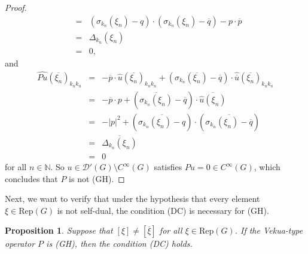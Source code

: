 \documentclass[sn-mathphys-num]{sn-jnl}%
\numberwithin{equation}{section}
\theoremstyle{thmstyleone}
\newtheorem{proposition}[theorem]{Proposition}
\theoremstyle{thmstyletwo}
\theoremstyle{thmstylethree}
\begin{document}
\begin{proof}
\begin{eqnarray*}
	& = & (\sigma_{k_n}(\xi_n)-q)\cdot (\sigma_{k_n}(\xi_n)-\overline{q})- p \cdot \overline{p} \\
	& = & \Delta_{k_n}(\xi_n) \\
	& = & 0, 
\end{eqnarray*} 
and
\begin{eqnarray*}
	\widehat{Pu}(\overline{\xi_n})_{k_n k_n} & = & -\overline{p}\cdot \widehat{u}(\overline{\xi_n})_{k_n k_n} + (\sigma_{k_n}(\overline{\xi_n})-\overline{q})\cdot \widehat{ \overline{u}}(\overline{\xi_n})_{k_n k_n} \\ 
	& = & -\overline{p} \cdot p +(\overline{\sigma_{k_n}(\xi_n)}-\overline{q}) \cdot \overline{ \widehat{u}(\xi_n)} \\
	& = & -|p|^2+ (\overline{\sigma_{k_n}(\xi_n)-q})\cdot (\overline{ \sigma_{k_n}(\xi_n)-\overline{q}}) \\
	& = & \overline{ \Delta_{k_n}(\xi_n)} \\
	& = & 0
\end{eqnarray*}
for all $n\in \mathbb{N}$. So $u \in \mathcal{D}'(G) \setminus C^\infty(G)$ satisfies $Pu=0 \in C^\infty(G)$, which concludes that $P$ is not (GH).
\end{proof}

Next, we want to verify that under the hypothesis that every element $\xi \in \textrm{Rep}(G)$ is not self-dual, the condition (DC) is necessary for (GH).

\begin{proposition} Suppose that $[\xi] \neq [\overline{\xi}]$ for all $\xi \in \textrm{Rep}(G)$. If the Vekua-type operator $P$ is (GH), then the condition (DC) holds.
\end{proposition} 
\end{document}
